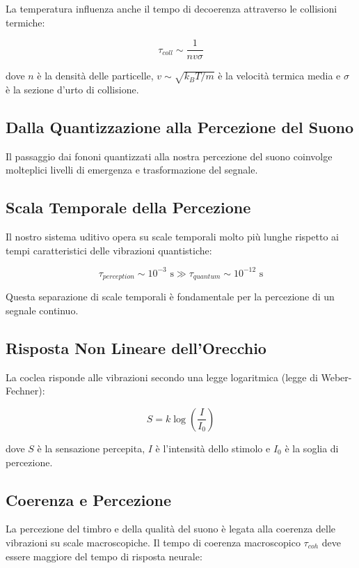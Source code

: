 \documentclass[a4paper,11pt]{article}
\begin{document}
La temperatura influenza anche il tempo di decoerenza attraverso le
collisioni termiche:

\[\tau_{coll} \sim \frac{1}{nv\sigma}\]

dove \(n\) è la densità delle particelle, \(v \sim \sqrt{k_BT/m}\) è la
velocità termica media e \(\sigma\) è la sezione d'urto di collisione.

\subsection{Dalla Quantizzazione alla Percezione del
Suono}\label{dalla-quantizzazione-alla-percezione-del-suono}

Il passaggio dai fononi quantizzati alla nostra percezione del suono
coinvolge molteplici livelli di emergenza e trasformazione del segnale.

\subsection{Scala Temporale della
Percezione}\label{scala-temporale-della-percezione}

Il nostro sistema uditivo opera su scale temporali molto più lunghe
rispetto ai tempi caratteristici delle vibrazioni quantistiche:

\[\tau_{perception} \sim 10^{-3} \text{ s} \gg \tau_{quantum} \sim 10^{-12} \text{ s}\]

Questa separazione di scale temporali è fondamentale per la percezione
di un segnale continuo.

\subsection{Risposta Non Lineare
dell'Orecchio}\label{risposta-non-lineare-dellorecchio}

La coclea risponde alle vibrazioni secondo una legge logaritmica (legge
di Weber-Fechner):

\[S = k \log\left(\frac{I}{I_0}\right)\]

dove \(S\) è la sensazione percepita, \(I\) è l'intensità dello stimolo
e \(I_0\) è la soglia di percezione.

\subsection{Coerenza e Percezione}\label{coerenza-e-percezione}

La percezione del timbro e della qualità del suono è legata alla
coerenza delle vibrazioni su scale macroscopiche. Il tempo di coerenza
macroscopico \(\tau_{coh}\) deve essere maggiore del tempo di risposta
neurale:
\end{document}
